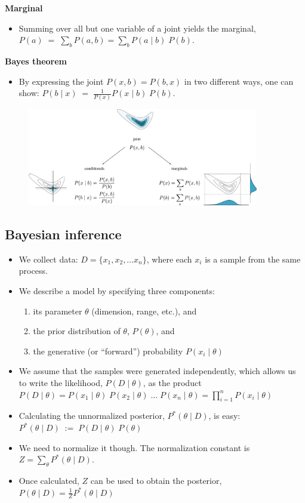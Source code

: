 {\bf Marginal}
\begin{itemize}
	\item Summing over all but one variable of a joint yields the marginal, $P(a) \;=\; \sum_b P(a,b) = \sum_b P(a\;|\;b) \; P(b)$.
\end{itemize}
{\bf Bayes theorem}
\begin{itemize}
	\item By expressing the joint $P(x,b) = P(b,x)$ in two different ways, one can show: $P(b\;|\;x) \;=\; \frac{1}{P(x)} P(x\;|\;b) \; P(b)$.
\end{itemize}
\begin{figure}[h]
	\centering
	\includegraphics[width=0.9\textwidth]{./figs/Joint-Conditional-Marginal.pdf}
\end{figure}

\subsection{Bayesian inference}
\label{sec:bayesian_inference}
\begin{itemize}
	\item We collect data: $D = \{x_1, x_2, \ldots x_n\}$, where each $x_i$ is a sample from the same process.
	\item We describe a model by specifying three components:
	\begin{enumerate}
		\item its parameter $\theta$ (dimension, range, etc.), and
		\item the prior distribution of $\theta$, $P(\theta)$, and
		\item the generative (or ``forward'') probability $P(x_i\;|\; \theta)$
	\end{enumerate}
	\item We assume that the samples were generated independently, which allows us to write the likelihood, $P(D\;|\;\theta)$, as the product $P(D\;|\;\theta) = P(x_1\;|\;\theta) \;P(x_2\;|\;\theta)\;\ldots \;P(x_n\;|\;\theta) = \prod_{i=1}^n P(x_i\;|\;\theta)$
	\item Calculating the unnormalized posterior, $P^\ast(\theta\;|\;D)$, is easy: $P^\ast(\theta\;|\;D) \;:=\; P(D\;|\;\theta) \;P(\theta)$
	\item We need to normalize it though. The normalization constant is $Z = \sum_\theta P^\ast(\theta\;|\;D)$.
	\item Once calculated, $Z$ can be used to obtain the posterior, $P(\theta\;|\;D) = \frac{1}{Z} P^\ast(\theta\;|\;D)$
\end{itemize}

